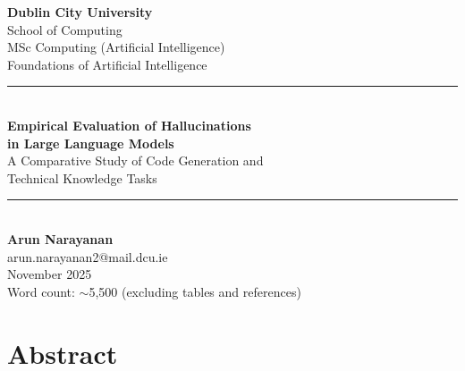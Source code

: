 \documentclass[12pt,a4paper]{article}
\begin{document}
\begin{titlepage}
  \centering
  \vspace*{2cm}

  {\LARGE\bfseries Dublin City University}\\[0.3cm]
  {\large School of Computing}\\[1.5cm]

  {\Large MSc Computing (Artificial Intelligence)}\\[0.5cm]
  {\large Foundations of Artificial Intelligence}\\[2cm]

  \rule{\textwidth}{1pt}\\[0.4cm]
  {\huge\bfseries Empirical Evaluation of Hallucinations\\in Large Language Models}\\[0.2cm]
  {\large A Comparative Study of Code Generation and\\Technical Knowledge Tasks}\\[0.4cm]
  \rule{\textwidth}{1pt}\\[2cm]

  {\large\bfseries Arun Narayanan}\\[0.3cm]
  {\large arun.narayanan2@mail.dcu.ie}\\[2cm]

  {\large November 2025}\\[1cm]

  \vfill
  {\small Word count: $\sim$5{,}500 (excluding tables and references)}
\end{titlepage}

\newpage
{\singlespacing
\tableofcontents
\listoftables
}
\newpage

\section*{Abstract}
\end{document}

